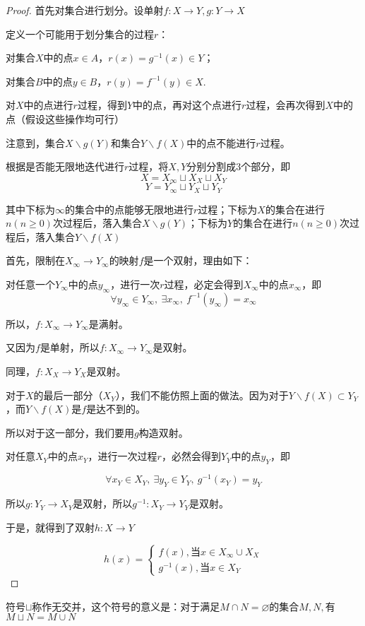 \begin{proof}
    首先对集合进行划分。设单射$f:X\rightarrow Y,g:Y\rightarrow X$

    定义一个可能用于划分集合的过程$r$：

    对集合$X$中的点$x\in A$，$r(x) = g^{-1}(x) \in Y$；

    对集合$B$中的点$y\in B$，$r(y) = f^{-1}(y) \in X$.

    对$X$中的点进行$r$过程，得到$Y$中的点，再对这个点进行$r$过程，会再次得到$X$中的点（假设这些操作均可行）

    注意到，集合$X\backslash g(Y)$和集合$Y\backslash f(X)$中的点不能进行$r$过程。

    根据是否能无限地迭代进行$r$过程，将$X,Y$分别分割成3个部分，即
    \[ X= X_\infty \sqcup X_X \sqcup X_Y\]
    \[Y = Y_\infty \sqcup Y_X \sqcup Y_Y\]

    其中下标为$\infty$的集合中的点能够无限地进行$r$过程；下标为$X$的集合在进行$n(n\geq 0)$次过程后，落入集合$X\backslash g(Y)$；下标为$Y$的集合在进行$n(n\geq 0)$次过程后，落入集合$Y\backslash f(X)$

    首先，限制在$X_\infty \rightarrow Y_\infty$的映射$f$是一个双射，理由如下：

    对任意一个$Y_\infty$中的点$y_\infty$，进行一次$r$过程，必定会得到$X_\infty$中的点$x_\infty$，即
    \[\forall y_\infty \in Y_\infty,\ \exists x_\infty ,\ f^{-1}\left(y_\infty \right) = x_\infty\]
    
    所以，$f:X_\infty \rightarrow Y_\infty$是满射。

    又因为$f$是单射，所以$f:X_\infty \rightarrow Y_\infty$是双射。

    同理，$f: X_X \rightarrow Y_X$是双射。

    对于$X$的最后一部分（$X_Y$），我们不能仿照上面的做法。因为对于$Y \backslash f(X) \subset Y_Y$，而$Y \backslash f(X)$是$f$是达不到的。

    所以对于这一部分，我们要用$g$构造双射。

    对任意$X_Y$中的点$x_Y$，进行一次过程$r$，必然会得到$Y_Y$中的点$y_Y$，即

    \[\forall x_Y \in X_Y,\ \exists y_Y\in Y_Y,\ g^{-1}(x_Y) = y_Y \]

    所以$g: Y_Y\rightarrow X_Y$是双射，所以$g^{-1}:X_Y \rightarrow Y_Y$是双射。

    于是，就得到了双射$h:X\rightarrow Y$

    \begin{equation*}
        h(x) =
    \begin{cases}
         f(x), \text{当}x\in X_\infty \cup X_X \\
         g^{-1}(x),\text{当}x\in X_Y
    \end{cases}
    \end{equation*}

\end{proof}

\begin{remark}
    符号$\sqcup$称作无交并，这个符号的意义是：对于满足$M\cap N = \varnothing$的集合$M,N,$有$M\sqcup N = M\cup N$
\end{remark}